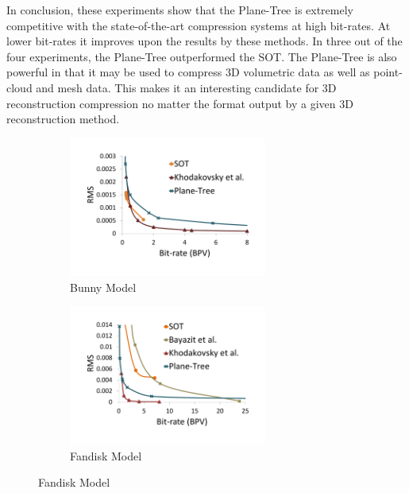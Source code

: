 In conclusion, these experiments show that the Plane-Tree is extremely competitive with the state-of-the-art compression systems at high bit-rates. At lower bit-rates it improves upon the results by these methods. In three out of the four experiments, the Plane-Tree outperformed the SOT. The Plane-Tree is also powerful in that it may be used to compress 3D volumetric data as well as point-cloud and mesh data. This makes it an interesting candidate for 3D reconstruction compression no matter the format output by a given 3D reconstruction method. \\

\begin{figure}[!htb] 
        \centering
        \begin{subfigure}[b]{6.8cm}
                \includegraphics[width=6.5cm]{images/results/compression/bunnysota}
                \caption{Bunny Model}
                \label{fig:SA_BUNNY}
        \end{subfigure}%
        \begin{subfigure}[b]{6.8cm}
                \includegraphics[width=6.5cm]{images/results/compression/fandisksota}
                \caption{Fandisk Model}
                \label{fig:SA_FANDISK}
        \end{subfigure}
        

\end{figure}
